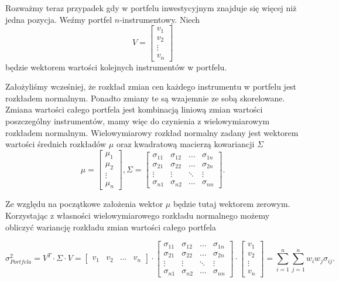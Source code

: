 \documentclass[11pt,titlepage]{article}
\numberwithin{equation}{section}
\begin{document}
Rozważmy teraz przypadek gdy w portfelu inwestycyjnym znajduje się więcej niż jedna pozycja. Weźmy portfel $n$-instrumentowy. Niech
$$V=\begin{bmatrix}
 v_1 \\ 
 v_2 \\
\vdots \\
v_n
\end{bmatrix}$$
będzie wektorem wartości kolejnych instrumentów w portfelu.

Założyliśmy wcześniej, że rozkład zmian cen każdego instrumentu w portfelu jest rozkładem normalnym. Ponadto zmiany te są wzajemnie ze sobą skorelowane. Zmiana wartości całego portfela jest kombinacją liniową zmian wartości poszczególny instrumentów, mamy więc do czynienia z wielowymiarowym rozkładem normalnym. Wielowymiarowy rozkład normalny zadany jest wektorem wartości średnich rozkładów $\mu$ oraz kwadratową macierzą kowariancji $\Sigma$
$$\mu=\begin{bmatrix}
 \mu_1 \\ 
 \mu_2 \\
\vdots \\
\mu_n
\end{bmatrix},\Sigma=\begin{bmatrix}
\sigma_{11} & \sigma_{12} & \hdots & \sigma_{1n} \\ 
\sigma_{21} & \sigma_{22} & \hdots & \sigma_{2n} \\
\vdots & \vdots & \ddots & \vdots\\
\sigma_{n1} & \sigma_{n2} & \hdots & \sigma_{nn}
\end{bmatrix}. $$

Ze względu na początkowe założenia wektor $\mu$ będzie tutaj wektorem zerowym. Korzystając z własności wielowymiarowego rozkładu normalnego możemy obliczyć wariancję rozkładu zmian wartości całego portfela 


$$ \sigma_{Portfela}^2 = V^T  \cdot \Sigma \cdot V =  \begin{bmatrix}
 v_1 & v_2 & \hdots & v_n
\end{bmatrix} 
\cdot
\begin{bmatrix}
\sigma_{11} & \sigma_{12} & \hdots & \sigma_{1n} \\ 
\sigma_{21} & \sigma_{22} & \hdots & \sigma_{2n} \\
\vdots & \vdots & \ddots & \vdots\\
\sigma_{n1} & \sigma_{n2} & \hdots & \sigma_{nn}
\end{bmatrix}  
\cdot
\begin{bmatrix}
 v_1 \\ 
 v_2 \\
\vdots \\
v_n
\end{bmatrix}
=\sum_{i=1}^{n}\sum_{j=1}^{n}w_i w_j \sigma_{ij}.
$$
\end{document}
